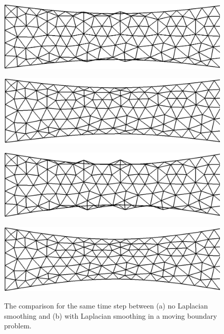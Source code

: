 \begin{figure}[H]
\begin{minipage}{.50\linewidth}
     \end{minipage}\\[7pt]
     \begin{minipage}{.50\linewidth}
      \centering
      \includegraphics[scale=0.19]{./02_chaps/cap_numerico/figure/no3.png}\\
     \end{minipage}%
     \begin{minipage}{.50\linewidth}
      \centering
      \includegraphics[scale=0.19]{./02_chaps/cap_numerico/figure/with3.png}\\
     \end{minipage}
     \begin{minipage}{.50\linewidth}
     \medskip
      \centering
      \includegraphics[scale=0.19]{./02_chaps/cap_numerico/figure/no4.png}\\
     \end{minipage}%
     \begin{minipage}{.50\linewidth}
     \medskip
      \centering
      \includegraphics[scale=0.19]{./02_chaps/cap_numerico/figure/with4.png}\\
     \end{minipage}
     \medskip
     \caption{
The comparison for the same time step between 
     (a) no Laplacian smoothing and
     (b) with Laplacian smoothing
in a moving boundary problem.
}
     \label{moving boundary fig}
\end{figure}




